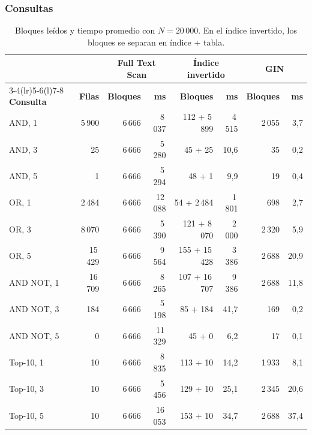 \documentclass[a4paper,12pt]{article}
\begin{document}
\subsubsection{Consultas}

\begin{table}[H]
\centering
\caption{Bloques leídos y tiempo promedio con $N = 20\,000$. En el índice
invertido, los bloques se separan en índice + tabla.}
\begin{tabular}{@{}lrrrrrrr@{}}
\toprule
& & \multicolumn{2}{c}{\textbf{Full Text Scan}} &
\multicolumn{2}{c}{\textbf{Índice invertido}} &
\multicolumn{2}{c}{\textbf{GIN}} \\
\cmidrule(lr){3-4}\cmidrule(lr){5-6}\cmidrule(l){7-8}
\textbf{Consulta} & \textbf{Filas} & \textbf{Bloques} & \textbf{ms} &
\textbf{Bloques} & \textbf{ms} & \textbf{Bloques} & \textbf{ms} \\
\midrule
AND, 1 & 5\,900 & 6\,666 & 8\,037 & 112 + 5\,899 & 4\,515 & 2\,055 & 3{,}7 \\
AND, 3 & 25 & 6\,666 & 5\,280 & 45 + 25 & 10{,}6 & 35 & 0{,}2 \\
AND, 5 & 1 & 6\,666 & 5\,294 & 48 + 1 & 9{,}9 & 19 & 0{,}4 \\
OR, 1 & 2\,484 & 6\,666 & 12\,088 & 54 + 2\,484 & 1\,801 & 698 & 2{,}7 \\
OR, 3 & 8\,070 & 6\,666 & 5\,390 & 121 + 8\,070 & 2\,000 & 2\,320 & 5{,}9 \\
OR, 5 & 15\,429 & 6\,666 & 9\,564 & 155 + 15\,428 & 3\,386 & 2\,688 & 20{,}9 \\
AND NOT, 1 & 16\,709 & 6\,666 & 8\,265 & 107 + 16\,707 & 9\,386 & 2\,688 & 11{,}8 \\
AND NOT, 3 & 184 & 6\,666 & 5\,198 & 85 + 184 & 41{,}7 & 169 & 0{,}2 \\
AND NOT, 5 & 0 & 6\,666 & 11\,329 & 45 + 0 & 6{,}2 & 17 & 0{,}1 \\
Top-10, 1 & 10 & 6\,666 & 8\,835 & 113 + 10 & 14{,}2 & 1\,933 & 8{,}1 \\
Top-10, 3 & 10 & 6\,666 & 5\,456 & 129 + 10 & 25{,}1 & 2\,345 & 20{,}6 \\
Top-10, 5 & 10 & 6\,666 & 16\,053 & 153 + 10 & 34{,}7 & 2\,688 & 37{,}4 \\
\bottomrule
\end{tabular}
\end{table}
\end{document}
